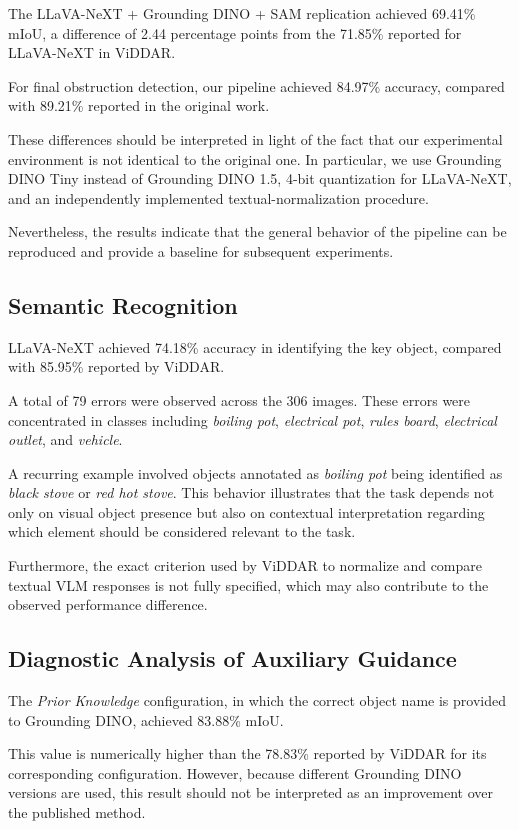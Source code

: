 \documentclass[conference]{IEEEtran}
\begin{document}
The LLaVA-NeXT + Grounding DINO + SAM replication achieved 69.41\% mIoU, a difference of 2.44 percentage points from the 71.85\% reported for LLaVA-NeXT in ViDDAR.

For final obstruction detection, our pipeline achieved 84.97\% accuracy, compared with 89.21\% reported in the original work.

These differences should be interpreted in light of the fact that our experimental environment is not identical to the original one. In particular, we use Grounding DINO Tiny instead of Grounding DINO 1.5, 4-bit quantization for LLaVA-NeXT, and an independently implemented textual-normalization procedure.

Nevertheless, the results indicate that the general behavior of the pipeline can be reproduced and provide a baseline for subsequent experiments.

\subsection{Semantic Recognition}

LLaVA-NeXT achieved 74.18\% accuracy in identifying the key object, compared with 85.95\% reported by ViDDAR.

A total of 79 errors were observed across the 306 images. These errors were concentrated in classes including \textit{boiling pot}, \textit{electrical pot}, \textit{rules board}, \textit{electrical outlet}, and \textit{vehicle}.

A recurring example involved objects annotated as \textit{boiling pot} being identified as \textit{black stove} or \textit{red hot stove}. This behavior illustrates that the task depends not only on visual object presence but also on contextual interpretation regarding which element should be considered relevant to the task.

Furthermore, the exact criterion used by ViDDAR to normalize and compare textual VLM responses is not fully specified, which may also contribute to the observed performance difference.


\subsection{Diagnostic Analysis of Auxiliary Guidance}

The \textit{Prior Knowledge} configuration, in which the correct object name is provided to Grounding DINO, achieved 83.88\% mIoU.

This value is numerically higher than the 78.83\% reported by ViDDAR for its corresponding configuration. However, because different Grounding DINO versions are used, this result should not be interpreted as an improvement over the published method.
\end{document}
